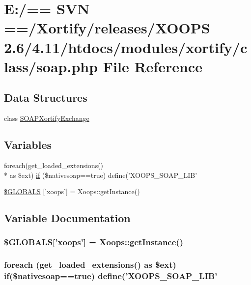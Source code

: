 \hypertarget{soap_8php}{\section{E\-:/== S\-V\-N ==/\-Xortify/releases/\-X\-O\-O\-P\-S 2.6/4.11/htdocs/modules/xortify/class/soap.php File Reference}
\label{soap_8php}
}
\subsection*{Data Structures}
\begin{DoxyCompactItemize}
\item 
class \hyperlink{class_s_o_a_p_xortify_exchange}{S\-O\-A\-P\-Xortify\-Exchange}
\end{DoxyCompactItemize}
\subsection*{Variables}
\begin{DoxyCompactItemize}
\item 
foreach(get\-\_\-loaded\-\_\-extensions() \\*
as \$ext) \hyperlink{soap_8php_a6146df301f89432497e6bfe9680af293}{if} (\$nativesoap==true) define('X\-O\-O\-P\-S\-\_\-\-S\-O\-A\-P\-\_\-\-L\-I\-B'
\item 
\hyperlink{soap_8php_ad10934112c0d18cf6b358d47afa6fcf1}{\$\-G\-L\-O\-B\-A\-L\-S} \mbox{[}'xoops'\mbox{]} = Xoops\-::get\-Instance()
\end{DoxyCompactItemize}


\subsection{Variable Documentation}
\hypertarget{soap_8php_ad10934112c0d18cf6b358d47afa6fcf1}{
\subsubsection[{\$\-G\-L\-O\-B\-A\-L\-S}]{\setlength{\rightskip}{0pt plus 5cm}\$G\-L\-O\-B\-A\-L\-S\mbox{[}'xoops'\mbox{]} = Xoops\-::get\-Instance()}}\label{soap_8php_ad10934112c0d18cf6b358d47afa6fcf1}
\hypertarget{soap_8php_a6146df301f89432497e6bfe9680af293}{
\subsubsection[{if}]{\setlength{\rightskip}{0pt plus 5cm}foreach (get\-\_\-loaded\-\_\-extensions() as \$ext) if(\$nativesoap==true) define('X\-O\-O\-P\-S\-\_\-\-S\-O\-A\-P\-\_\-\-L\-I\-B'}}\label{soap_8php_a6146df301f89432497e6bfe9680af293}
